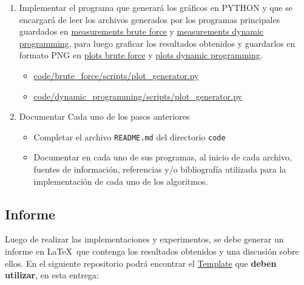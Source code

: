 \begin{enumerate}[(1)]
    \item Implementar el programa que generará los gráficos en PYTHON y que se encargará de leer los archivos generados por los programas principales guardados en  \href{https://github.com/pabloealvarez/INF221-2025-1-TAREA-1/blob/master/code/sorting/data/measurements/}{measurements brute force} y \href{https://github.com/pabloealvarez/INF221-2025-1-TAREA-1/blob/master/code/sortmatrix+multiplication/data/measurements/}{measurements dynamic programming}, para luego graficar los resultados obtenidos y guardarlos en formato PNG en  \href{https://github.com/pabloealvarez/INF221-2025-1-TAREA-1/blob/master/code/sorting/data/plots/}{plots brute force} y \href{https://github.com/pabloealvarez/INF221-2025-1-TAREA-1/blob/master/code/sortmatrix+multiplication/data/plots/}{plots dynamic programming}.
    \begin{itemize}
        \item \href{https://github.com/pabloealvarez/INF221-2025-1-TAREA-1/blob/master/code/sorting/scripts/array_generator.py}{code/brute\_force/scripts/plot\_generator.py}
        \item \href{https://github.com/pabloealvarez/INF221-2025-1-TAREA-1/blob/master/code/matrix_multiplication/scripts/matrix_generator.py}{code/dynamic\_programming/scripts/plot\_generator.py}
    \end{itemize}
    \item Documentar Cada uno de los pasos anteriores
    \begin{itemize}
        \item Completar el archivo \texttt{README.md} del directorio \texttt{code}
        \item Documentar en cada uno de sus programas, al inicio de cada archivo, fuentes de información, referencias y/o bibliografía utilizada para la implementación de cada uno de los algoritmos.
    \end{itemize}
\end{enumerate}

\subsection{Informe} \label{subsec:report}

Luego de realizar las implementaciones y experimentos, se debe generar un informe en \LaTeX\ que contenga los resultados obtenidos y una discusión sobre ellos. En el siguiente repositorio podrá encontrar el \href{https://github.com/pabloealvarez/INF221-2025-1-TAREA-1/tree/master/report}{Template} que \textbf{deben utilizar}, en esta entrega:

